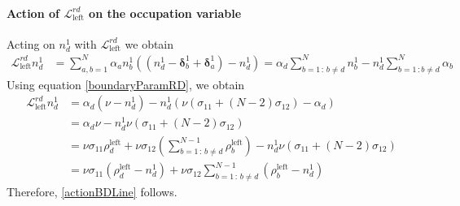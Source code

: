 \documentclass[10pt]{article}
\numberwithin{equation}{section}
\numberwithin{equation}{subsection}
\begin{document}
\paragraph{Action of $\mathcal{L}_{\text{left}}^{rd}$ on the occupation variable}
Acting on $n_{d}^{1}$  with $\mathcal{L}_{\text{left}}^{rd}$ we obtain
\begin{equation}\label{actionBoudaryRD}
	\begin{split}
		\mathcal{L}_{\text{left}}^{rd}n_{d}^{1}&=\sum_{a,b=1}^{N}\alpha_{a}n_{b}^{1}\left((n_{d}^{1}-\bm{\delta}_{b}^{1}+\bm{\delta}_{a}^{1})-n_{d}^{1}\right)=\alpha_{d}\sum_{b=1\,:\,b\neq d}^{N}n_{b}^{1}-n_{d}^{1}\sum_{b=1\,:b\neq d}^{N}\alpha_{b}
	\end{split}
\end{equation}
Using equation \eqref{boundaryParamRD}, we obtain 
\begin{align}
			\mathcal{L}_{\text{left}}^{rd}n_{d}^{1}&=
		\alpha_{d}\left(\nu-n_{d}^{1}\right)-n_{d}^{1}\left(\nu(\sigma_{11}+(N-2)\sigma_{12})-\alpha_{d}\right)
		\\&=\alpha_{d}\nu-n_{d}^{1}\nu(\sigma_{11}+(N-2)\sigma_{12})
		\\&=
		\nu\sigma_{11}\rho_{d}^{\text{left}}+\nu\sigma_{12}\left(\sum_{b=1\,:\,b\neq d}^{N-1}\rho_{b}^{\text{left}}\right)-n_{d}^{1}\nu(\sigma_{11}+(N-2)\sigma_{12})
		\\&=
		\nu \sigma_{11} (\rho_{d}^{\text{left}}-n_{d}^{1})+\nu\sigma_{12}\sum_{b=1\,:\,b\neq d}^{N-1}(\rho_{b}^{\text{left}}-n_{d}^{1})
	\end{align}
Therefore, \eqref{actionBDLine} follows.
\end{document}

